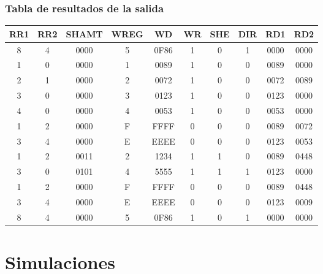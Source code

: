 \documentclass[8pt,executivepaper]{article}
\begin{document}
\subsubsection{Tabla de resultados de la salida}
\begin{tabular}{|c|c|c|c|c|c|c|c|c|c|}
  \hline
  RR1 & RR2 & SHAMT & WREG & WD & WR & SHE & DIR & RD1 & RD2\\
  \hline
  8 & 4 & 0000 & 5 & 0F86 & 1 & 0 & 1 & 0000 & 0000 \\
  1 & 0 & 0000 & 1 & 0089 & 1 & 0 & 0 & 0089 & 0000 \\
  2 & 1 & 0000 & 2 & 0072 & 1 & 0 & 0 & 0072 & 0089 \\
  3 & 0 & 0000 & 3 & 0123 & 1 & 0 & 0 & 0123 & 0000 \\
  4 & 0 & 0000 & 4 & 0053 & 1 & 0 & 0 & 0053 & 0000 \\
  1 & 2 & 0000 & F & FFFF & 0 & 0 & 0 & 0089 & 0072 \\
  3 & 4 & 0000 & E & EEEE & 0 & 0 & 0 & 0123 & 0053 \\
  1 & 2 & 0011 & 2 & 1234 & 1 & 1 & 0 & 0089 & 0448 \\
  3 & 0 & 0101 & 4 & 5555 & 1 & 1 & 1 & 0123 & 0000 \\
  1 & 2 & 0000 & F & FFFF & 0 & 0 & 0 & 0089 & 0448 \\
  3 & 4 & 0000 & E & EEEE & 0 & 0 & 0 & 0123 & 0009 \\
  8 & 4 & 0000 & 5 & 0F86 & 1 & 0 & 1 & 0000 & 0000 \\
  \hline
\end{tabular}
\section{Simulaciones}
\end{document}
